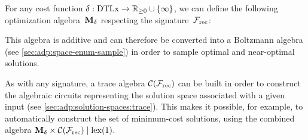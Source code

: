 For any cost function \(\delta\kern.1pt : \mathrm{D}\mathrm{T}\mathrm{L}\mathrm{x} \rightarrow \mathbb{R}_{\ge 0} \cup \{\infty\}\), we can define the following optimization algebra~\(\mathbf{M}_\delta\kern.1pt\) respecting the signature~\(\mathcal{F}_{\mathrm{rec}}\):\\

This algebra is additive and can therefore be converted into a Boltzmann algebra (see \cref{sec:adp:space-enum-sample}) in order to sample optimal and near-optimal solutions.

As with any signature, a trace algebra \(\mathcal{C}(\mathcal{F}_{\mathrm{rec}})\) can be built in order to construct the algebraic circuits representing the solution space associated with a given input (see \cref{sec:adp:solution-spaces:trace}).
This makes it possible, for example, to automatically construct the set of minimum-cost solutions, using the combined algebra \(\mathbf{M}_\delta\kern.1pt \times \mathcal{C}(\mathcal{F}_{\mathrm{rec}}) \mid \mathrm{lex}(1)\).

